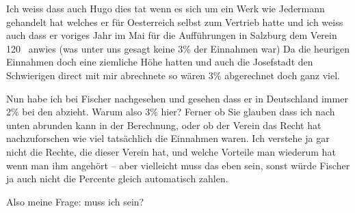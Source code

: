 \pstart
           Ich weiss dass auch Hugo dies tat wenn es sich
               um ein Werk wie Jedermann gehandelt hat welches
               er für Oesterreich selbst zum Vertrieb hatte
               und ich weiss auch dass er voriges Jahr im Mai für die Aufführungen in
                  Salzburg dem Verein 120 \label{K_L02525-1v}\label{K_L02525-1} anwies (was unter uns gesagt keine 3{\%} der Einnahmen war) Da die heurigen Einnahmen doch eine
               ziemliche Höhe hatten und auch die Josefstadt den
                  Schwierigen direct mit mir abrechnete so
               wären 3{\%}{ } abgerechnet doch ganz viel.\pend
           
\pstart
           Nun habe ich bei Fischer nachgesehen und gesehen
               dass er in Deutschland immer 2{\%} bei den \label{T_L02525-1v}\label{T_L02525-1} abzieht. Warum also 3{\%} hier? Ferner ob Sie glauben dass ich nach unten abrunden
               kann in der Berechnung, oder ob der Verein das Recht hat nachzuforschen wie viel tatsächlich die Einnahmen
               waren. Ich verstehe ja gar nicht die Rechte, die dieser Verein hat, und welche Vorteile man
               wiederum hat wenn man ihm angehört – aber vielleicht muss das eben sein, sonst würde
               Fischer ja auch nicht die Percente gleich automatisch zahlen.\pend
           
\pstart
           Also meine Frage: muss ich  sein?\pend
           
